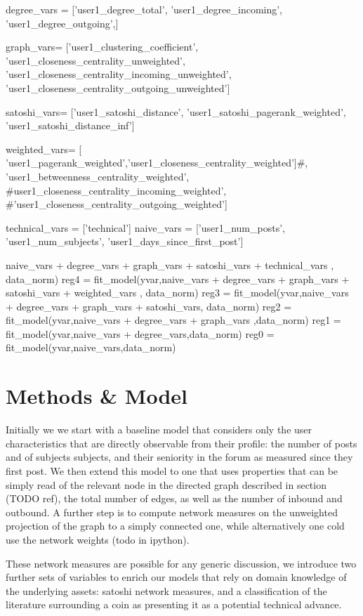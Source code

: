
degree_vars = ['user1_degree_total',
           'user1_degree_incoming', 'user1_degree_outgoing',]

graph_vars=       ['user1_clustering_coefficient',
           'user1_closeness_centrality_unweighted',
           'user1_closeness_centrality_incoming_unweighted',
           'user1_closeness_centrality_outgoing_unweighted']

satoshi_vars=       ['user1_satoshi_distance',
            'user1_satoshi_pagerank_weighted',
            'user1_satoshi_distance_inf']

weighted_vars=       [ 'user1_pagerank_weighted','user1_closeness_centrality_weighted']#,  'user1_betweenness_centrality_weighted',
           #user1_closeness_centrality_incoming_weighted',
           #'user1_closeness_centrality_outgoing_weighted']

technical_vars = ['technical']
naive_vars = ['user1_num_posts', 'user1_num_subjects',
           'user1_days_since_first_post']
           
           

naive_vars  + degree_vars + graph_vars  + satoshi_vars + technical_vars , data_norm)
        reg4 =  fit_model(yvar,naive_vars  + degree_vars + graph_vars  + satoshi_vars + weighted_vars , data_norm)
        reg3 =  fit_model(yvar,naive_vars  + degree_vars + graph_vars  + satoshi_vars, data_norm)
        reg2 =  fit_model(yvar,naive_vars  + degree_vars + graph_vars ,data_norm)
        reg1 =  fit_model(yvar,naive_vars  + degree_vars,data_norm)
        reg0 = fit_model(yvar,naive_vars,data_norm)
        
\section{Methods & Model}

Initially we we start with a baseline model that considers only the user characteristics that are directly observable from their profile: the number of posts and of subjects subjects, and their seniority in the forum as measured since they first post.
We then extend this model to one that uses properties that can be simply read of the relevant node in the directed graph described in section (TODO ref), the total number of edges, as well as the number of inbound and outbound.
A further step is to compute network measures on the unweighted projection of the graph to a simply connected one, while alternatively one cold use the network weights (todo in ipython). 

These network measures are possible for any generic discussion, we introduce two further sets of variables to enrich our models that rely on domain knowledge of the underlying assets: satoshi network measures, and a classification of the literature surrounding a coin as presenting it as a potential technical advance.

